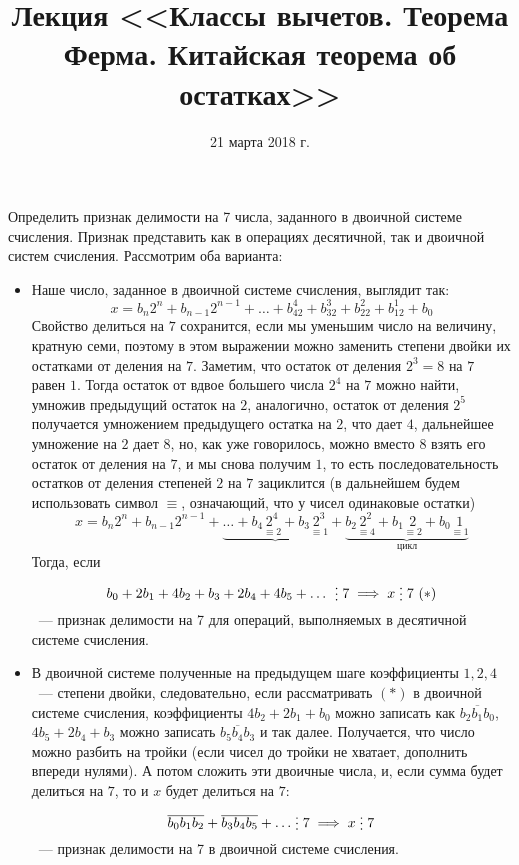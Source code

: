 \documentclass[russian]{lecture-notes}
\title{Лекция <<Классы вычетов. Теорема Ферма. Китайская теорема об остатках>>}
\date{21 марта 2018 г.}
\newcommand{\divs}{\mathrel{\raisebox{-2pt}{\vdots}}}
\newcommand{\klas}[1]{\overline{#1}}
\begin{document}
	\maketitle

\begin{problem}
	Определить признак делимости на 7 числа, заданного в двоичной системе счисления. Признак представить как в операциях десятичной, так и двоичной систем счисления. Рассмотрим оба варианта:
	\begin{itemize}
		\item Наше число, заданное в двоичной системе счисления, выглядит так: 
			\[x=b_n2^n + b_{n-1}2^{n-1} + \dots + b_42^4+ b_32^3 + b_22^2+b_12^1+b_0\]	
			Свойство делиться на $7$ сохранится, если мы уменьшим число на величину, кратную семи, поэтому в этом выражении можно заменить степени двойки их остатками от деления на $7$. Заметим, что остаток от деления $2^3 = 8$ на $7$ равен $1$. Тогда остаток от вдвое большего числа $2^4$ на $7$ можно найти, умножив предыдущий остаток на $2$, аналогично, остаток от деления $2^5$ получается умножением предыдущего остатка на $2$, что дает $4$, дальнейшее умножение на $2$ дает $8$, но, как уже говорилось, можно вместо $8$ взять его остаток от деления на $7$, и мы снова получим $1$, то есть последовательность остатков от деления степеней $2$ на $7$ зациклится (в дальнейшем будем использовать символ $\equiv$, означающий, что у чисел одинаковые остатки)
			\[x=b_n2^n + b_{n-1}2^{n-1} + \underbrace{\dots + b_4\underset{\equiv 2}{2^4}+ b_3\underset{\equiv 1}{2^3}} + \underbrace{b_2\underset{\equiv 4}{2^2}+b_1\underset{\equiv 2}{2}+b_0\underset{\equiv 1}{1}}_{\text{цикл}}\]
			Тогда, если 
			\[
				b_0 + 2b_1 + 4b_2 + b_3 + 2b_4 + 4b_5 + \ldots \ \divs 7 \implies x \divs 7 \ (\ast) 
			\]~--- признак делимости на 7 для операций, выполняемых в десятичной системе счисления.
		\item В двоичной системе полученные на предыдущем шаге коэффициенты $1, 2, 4$~--- степени двойки, следовательно, если рассматривать $(\ast)$ в двоичной системе счисления, коэффициенты $4b_2 + 2b_1 + b_0$ можно записать как $\klas{b_2b_1b_0}$, $4b_5 + 2b_4 + b_3$ можно записать $\klas{b_5b_4b_3}$ и так далее. Получается, что число можно разбить на тройки (если чисел до тройки не хватает, дополнить впереди нулями). А потом сложить эти двоичные числа, и, если сумма будет делиться на $7$, то и $x$ будет делиться на $7$: 
		\[ 
			\klas{b_0b_1b_2} + \klas{b_3b_4b_5} + \ldots \divs 7 \implies x \divs 7 
		\]
		~--- признак делимости на 7 в двоичной системе счисления.
	\end{itemize}
	

\end{problem}
\end{document}
